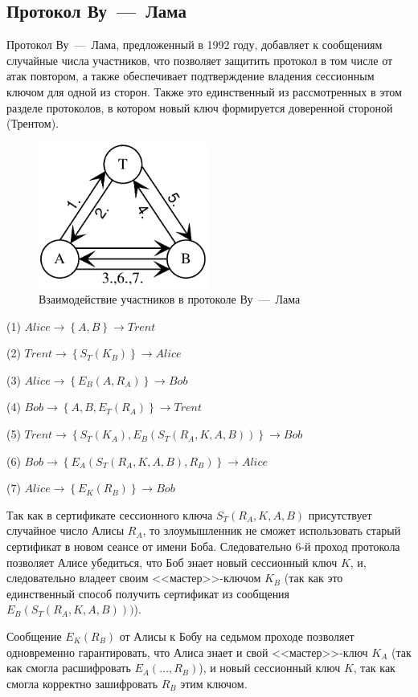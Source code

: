 \subsection{Протокол Ву~---~Лама}\label{section-woo-lama}

Протокол Ву~---~Лама, предложенный в 1992 году, добавляет к сообщениям случайные числа участников, что позволяет защитить протокол в том числе от атак повтором, а также обеспечивает подтверждение владения сессионным ключом для одной из сторон. Также это единственный из рассмотренных в этом разделе протоколов, в котором новый ключ формируется доверенной стороной (Трентом).

\begin{figure}
    \centering
    \includegraphics[width=0.5\textwidth]{pic/woo-lama}
    \caption{Взаимодействие участников в протоколе Ву~---~Лама\label{fig:woo-lama}}
\end{figure}

\begin{protocol}
    \item[(1)] $Alice \to \left\{ A, B \right\} \to Trent$
    \item[(2)] $Trent \to \left\{ S_T( K_B ) \right\} \to Alice$
    \item[(3)] $Alice \to \left\{ E_B ( A, R_A ) \right\} \to Bob$
    \item[(4)] $Bob \to \left\{ A, B, E_T( R_A ) \right\} \to Trent$
    \item[(5)] $Trent \to \left\{ S_T( K_A ), E_B ( S_T ( R_A, K, A, B ) ) \right\} \to Bob$
    \item[(6)] $Bob \to \left\{ E_A (S_T (R_A, K, A, B), R_B) \right\} \to Alice$
    \item[(7)] $Alice \to \left\{ E_K( R_B ) \right\} \to Bob$
\end{protocol}

Так как в сертификате сессионного ключа $S_T (R_A, K, A, B)$ присутствует случайное число Алисы $R_A$, то злоумышленник не сможет использовать старый сертификат в новом сеансе от имени Боба. Следовательно 6-й проход протокола позволяет Алисе убедиться, что Боб знает новый сессионный ключ $K$, и, следовательно владеет своим <<мастер>>-ключом $K_B$ (так как это единственный способ получить сертификат из сообщения $E_B ( S_T ( R_A, K, A, B ) ))$).

Сообщение $E_K( R_B )$ от Алисы к Бобу на седьмом проходе позволяет одновременно гарантировать, что Алиса знает и свой <<мастер>>-ключ $K_A$ (так как смогла расшифровать $E_A(\dots, R_B)$), и новый сессионный ключ $K$, так как смогла корректно зашифровать $R_B$ этим ключом.

